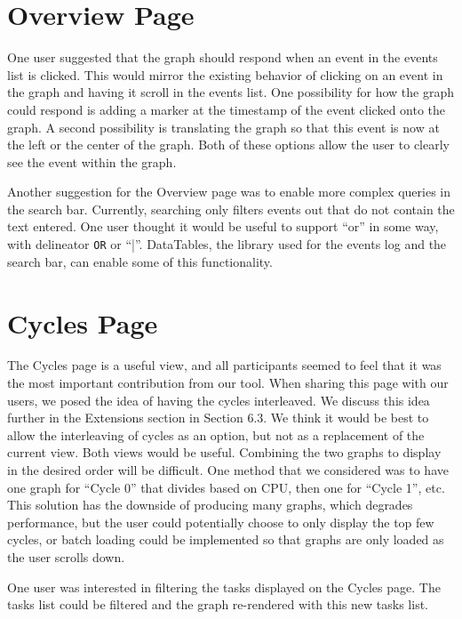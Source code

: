 \documentclass{hmcclinic}
\begin{document}
\section{Overview Page}
One user suggested that the graph should respond when an event in the events list is clicked.
 This would mirror the existing behavior of clicking on an event in the graph and having
  it scroll in the events list. One possibility for how the graph could respond is adding
   a marker at the timestamp of the event clicked onto the graph. A second possibility is
    translating the graph so that this event is now at the left or the center of the graph. Both of these options allow the user to clearly see the event within the graph.

  Another suggestion for the Overview page was to enable more complex queries in the 
  search bar. Currently, searching only filters events out that do not 
  contain the text entered. One user thought it would be useful to support
  ``or'' in 
  some way, with delineator \texttt{OR} or ``|''. DataTables, the library used for the 
  events log and the search bar, can enable some of this functionality.

  \section{Cycles Page}

  The Cycles page is a useful view, and all participants seemed to feel that 
  it was the most important contribution from our tool. When sharing this page
  with our users, 
  we posed the idea of having the cycles interleaved. We discuss this idea
  further in the Extensions section in Section 6.3. We think it would be best to allow the interleaving of cycles as 
  an option, but not as a replacement of the current view. Both views would be 
  useful. Combining the two graphs to display in the desired order will be 
  difficult. One method that we considered was to have one graph for ``Cycle 0''
  that divides based on CPU, then one for ``Cycle 1'', etc. This solution has the
  downside of producing many graphs, which degrades performance, but the user could potentially choose to
  only display the top few cycles, or batch loading could be implemented so that
  graphs are only loaded as the user scrolls down.

  One user was interested in filtering the tasks displayed on the Cycles page.
  The tasks list could be filtered and the graph re-rendered with this new tasks
  list.
\end{document}
